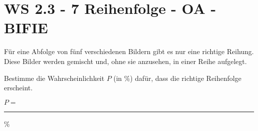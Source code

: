 \section{WS 2.3 - 7 Reihenfolge - OA - BIFIE}

\begin{beispiel}[WS 2.3]{1}
Für eine Abfolge von fünf verschiedenen Bildern gibt es nur eine richtige Reihung. Diese Bilder werden gemischt und, ohne sie anzusehen, in einer Reihe aufgelegt. \leer

Bestimme die Wahrscheinlichkeit $P$ (in \%) dafür, dass die richtige Reihenfolge erscheint. \leer

$P=$\rule{4cm}{0.3pt}\%

\end{beispiel}